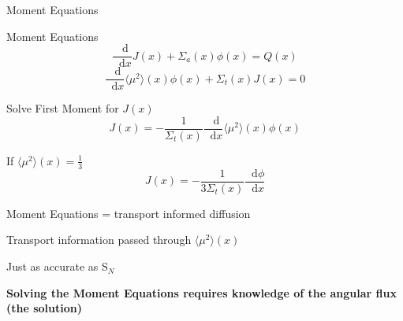\documentclass[10pt]{beamer}
\newcommand{\SN}{S$_N$\xspace}
\newcommand{\ud}{\mathop{}\!\mathrm{d}} %
\newcommand{\dderiv}[2]{\frac{\ud #1}{\ud #2}}
\newcommand{\edd}{\langle \mu^2 \rangle}
\begin{document}
\begin{frame}{Moment Equations}

	\footnotesize
	\begin{block}{Moment Equations}
	\begin{equation*}
		\dderiv{}{x} J(x) + \Sigma_a(x) \phi(x) = Q(x) \tag{\footnotesize Zeroth Moment}
	\end{equation*}
	\begin{equation*}
		\dderiv{}{x} \edd(x) \phi(x) 
		+ \Sigma_t(x) J(x) = 0 
        \tag{\footnotesize First Moment}
	\end{equation*}
	\end{block}

	\pause
	Solve First Moment for $J(x)$ 
	\begin{equation*}
		J(x) = -\frac{1}{\Sigma_t(x)} \dderiv{}{x} \edd(x) \phi(x)
	\end{equation*}

    \pause
    If $\edd(x) = \frac{1}{3}$
    \begin{equation*}
        J(x) = -\frac{1}{3\Sigma_t(x)} \dderiv{\phi}{x} \tag{Fick's Law}
    \end{equation*}

    \pause
    Moment Equations = transport informed diffusion

    \pause
    Transport information passed through $\edd(x)$ 

    \pause
    Just as accurate as \SN

    \pause
    \textbf{Solving the Moment Equations requires knowledge of the angular flux (the solution)}    


\end{frame}
\end{document}
